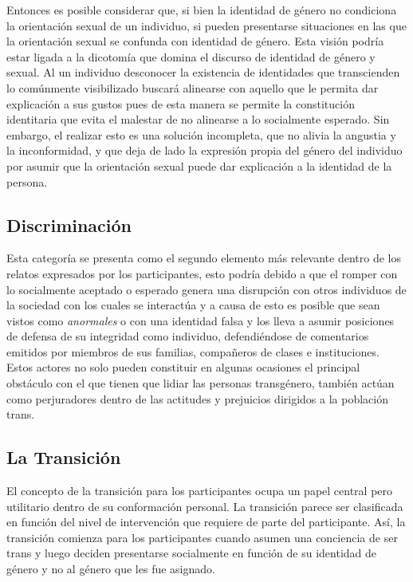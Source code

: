 Entonces es posible considerar que, si bien la identidad de género no condiciona
la orientación sexual de un individuo, si pueden presentarse situaciones en las
que la orientación sexual se confunda con identidad de género. Esta visión
podría estar ligada a la dicotomía que domina el discurso de identidad de género
y sexual. Al un individuo desconocer la existencia de identidades que
transcienden lo comúnmente visibilizado buscará alinearse con aquello que le
permita dar explicación a sus gustos pues de esta manera se permite la
constitución identitaria que evita el malestar de no alinearse a lo socialmente
esperado. Sin embargo, el realizar esto es una solución incompleta, que no
alivia la angustia y la inconformidad, y que deja de lado la expresión propia
del género del individuo por asumir que la orientación sexual puede dar
explicación a la identidad de la persona.

\subsection{Discriminación}\label{ssec:discriminacion}

Esta categoría se presenta como el segundo elemento más relevante dentro de los
relatos expresados por los participantes, esto podría debido a que el romper con
lo socialmente aceptado o esperado genera una disrupción con otros individuos de
la sociedad con los cuales se interactúa y a causa de esto es posible que sean
vistos como \emph{anormales} o con una identidad falsa y los lleva a asumir
posiciones de defensa de su integridad como individuo, defendiéndose de
comentarios emitidos por miembros de sus familias, compañeros de clases e
instituciones. Estos actores no solo pueden constituir en algunas ocasiones el
principal obstáculo con el que tienen que lidiar las personas transgénero,
también actúan como perjuradores dentro de las actitudes y prejuicios dirigidos
a la población trans.

\subsection{La Transición}\label{ssec:transicion}

El concepto de la transición para los participantes ocupa un papel central pero
utilitario dentro de su conformación personal. La transición parece ser
clasificada en función del nivel de intervención que requiere de parte del
participante. Así, la transición comienza para los participantes cuando asumen
una conciencia de ser trans y luego deciden presentarse socialmente en función
de su identidad de género y no al género que les fue asignado.

